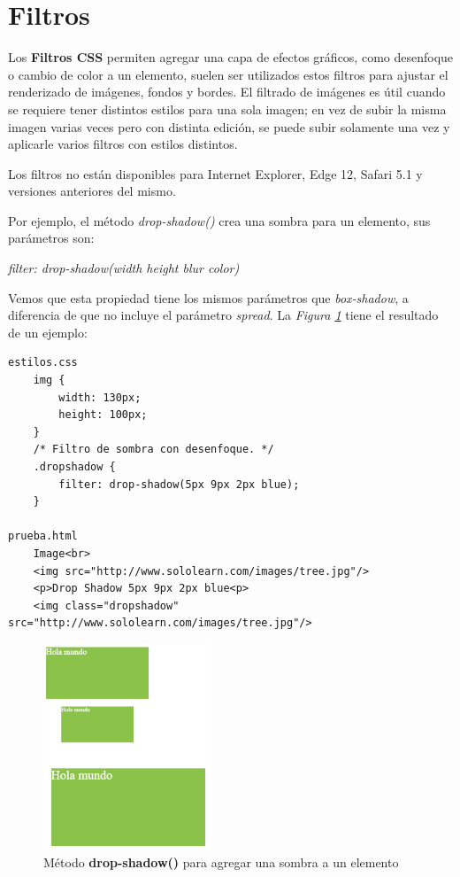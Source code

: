 \section{Filtros}

Los \textbf{Filtros CSS} permiten agregar una capa de efectos gráficos, como desenfoque o cambio de color a un elemento, suelen ser utilizados estos filtros para ajustar el renderizado de imágenes, fondos y bordes. El filtrado de imágenes es útil cuando se requiere tener distintos estilos para una sola imagen; en vez de subir la misma imagen varias veces pero con distinta edición, se puede subir solamente una vez y aplicarle varios filtros con estilos distintos.

Los filtros no están disponibles para Internet Explorer, Edge 12, Safari 5.1 y versiones anteriores del mismo.

Por ejemplo, el método \textit{drop-shadow()} crea una sombra para un elemento, sus parámetros son:
\begin{center}
    \textit{filter: drop-shadow(width height blur color)}
\end{center}

Vemos que esta propiedad tiene los mismos parámetros que \textit{box-shadow}, a diferencia de que no incluye el parámetro \textit{spread}. La \textit{Figura \ref{fig: 57}} tiene el resultado de un ejemplo:
\begin{lstlisting}
estilos.css
    img {
        width: 130px;
        height: 100px;
    }
    /* Filtro de sombra con desenfoque. */
    .dropshadow {
        filter: drop-shadow(5px 9px 2px blue);
    }

prueba.html
    Image<br>
    <img src="http://www.sololearn.com/images/tree.jpg"/>
    <p>Drop Shadow 5px 9px 2px blue<p>
    <img class="dropshadow" src="http://www.sololearn.com/images/tree.jpg"/>
\end{lstlisting}
\begin{figure}[H]
    \centering
    \caption{Método \textbf{drop-shadow()} para agregar una sombra a un elemento}
    \label{fig: 57}
    \includegraphics[width=5cm]{ss/scale.png}
\end{figure}


